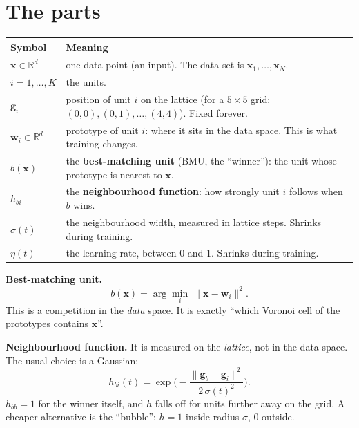 \documentclass[11pt,a4paper]{article}
\newcommand{\vect}[1]{\mathbf{#1}}
\newcommand{\R}{\mathbb{R}}
\newcommand{\x}{\vect{x}}
\newcommand{\w}{\vect{w}}
\newcommand{\g}{\vect{g}}
\begin{document}
\section{The parts}

\begin{center}\small
\begin{tabular}{@{}p{3.2cm}p{11.4cm}@{}}
\toprule
Symbol & Meaning\\
\midrule
$\x\in\R^d$ & one data point (an input). The data set is $\x_1,\dots,\x_N$.\\
$i=1,\dots,K$ & the units.\\
$\g_i$ & position of unit $i$ on the lattice (for a $5\times5$ grid: $(0,0),(0,1),\dots,(4,4)$). Fixed forever.\\
$\w_i\in\R^d$ & prototype of unit $i$: where it sits in the data space. This is what training changes.\\
$b(\x)$ & the \textbf{best-matching unit} (BMU, the ``winner''): the unit whose prototype is nearest to $\x$.\\
$h_{bi}$ & the \textbf{neighbourhood function}: how strongly unit $i$ follows when $b$ wins.\\
$\sigma(t)$ & the neighbourhood width, measured in lattice steps. Shrinks during training.\\
$\eta(t)$ & the learning rate, between 0 and 1. Shrinks during training.\\
\bottomrule
\end{tabular}
\end{center}

\textbf{Best-matching unit.}
\begin{equation}
b(\x)=\arg\min_i\ \|\x-\w_i\|^2 .
\end{equation}
This is a competition in the \emph{data} space. It is exactly ``which Voronoi cell of the prototypes contains $\x$''.

\textbf{Neighbourhood function.} It is measured on the \emph{lattice}, not in the data space. The usual choice is a
Gaussian:
\begin{equation}
h_{bi}(t)=\exp\!\Big(-\frac{\|\g_b-\g_i\|^2}{2\,\sigma(t)^2}\Big).
\end{equation}
$h_{bb}=1$ for the winner itself, and $h$ falls off for units further away on the grid. A cheaper alternative is the
``bubble'': $h=1$ inside radius $\sigma$, $0$ outside.
\end{document}
